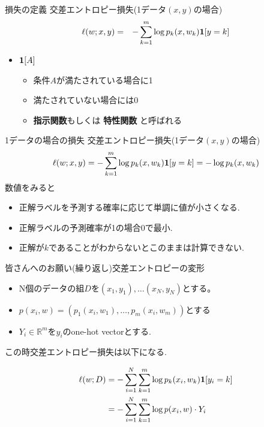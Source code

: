 \begin{frame}{損失の定義}
交差エントロピー損失(1データ$(x,y)$の場合)
\begin{eqnarray*}
\ell(w;x,y) &=& -\sum_{k=1}^{m}\log p_k(x, w_k){\bf 1}[y=k]
\end{eqnarray*}
\begin{itemize}
\item ${\bf 1}[A]$
  \begin{itemize}
  \item 条件$A$が満たされている場合に1
  \item 満たされていない場合には0
  \item \textbf{指示関数}もしくは \textbf{特性関数} と呼ばれる
  \end{itemize}
\end{itemize}
\end{frame}

\begin{frame}{1データの場合の損失}
交差エントロピー損失(1データ$(x,y)$の場合)
\begin{eqnarray*}
\ell(w;x,y) = -\sum_{k=1}^{m}\log p_k(x, w_k){\bf 1}[y=k] = - \log p_k(x, w_k)
\end{eqnarray*}
数値をみると
\begin{itemize}
  \item 正解ラベルを予測する確率に応じて単調に値が小さくなる.
  \item 正解ラベルの予測確率が1の場合0で最小.
  \item 正解が$k$であることがわからないとこのままは計算できない.
\end{itemize}
\end{frame}

\begin{frame}{皆さんへのお願い(繰り返し)}交差エントロピーの変形
  \begin{itemize}
\item N個のデータの組$D$を$(x_1,y_1), \ldots (x_N, y_N)$とする。
\item $p(x_i, w) = (p_1(x_i, w_1), \ldots, p_m(x_i, w_m))$とする
\item $Y_i \in \mathbb{R}^m$を$y_i$のone-hot vectorとする.
  \end{itemize}

この時交差エントロピー損失は以下になる.

\begin{align}
\ell(w;D) &= -\sum_{i=1}^{N}\sum_{k=1}^{m}\log p_k(x_i, w_k){\bf 1}[y_i=k] \\
          &= -\sum_{i=1}^{N}\sum_{k=1}^{m}\log p(x_i, w) \cdot Y_i
\end{align}
\end{frame}

